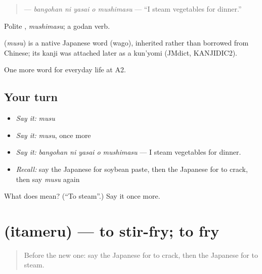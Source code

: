 \begin{quote}
\textbf{  } — \emph{bangohan ni yasai o mushimasu} — \textquotedblleft{}I steam vegetables for dinner.\textquotedblright{}
\end{quote}

Polite \textbf{}, \emph{mushimasu}; a godan verb.

\begin{cousinweb}
\textbf{} (\emph{musu}) is a native Japanese word (wago), inherited rather than borrowed from Chinese; its kanji was attached later as a kun'yomi (JMdict, KANJIDIC2).
\end{cousinweb}

\begin{grammarlens}[title={What you've built}]
One more word for everyday life at A2.
\end{grammarlens}

\subsection*{Your turn}
\begin{itemize}
\raggedright
  \item \emph{Say it:} \emph{musu}
  \item \emph{Say it:} \emph{musu}, once more
  \item \emph{Say it:} \emph{bangohan ni yasai o mushimasu} — I steam vegetables for dinner.
  \item \emph{Recall:} say the Japanese for soybean paste, then the Japanese for to crack, then say \emph{musu} again
\end{itemize}

\begin{tcolorbox}[breakable,colback=teal!4,colframe=teal!35!black,title={Before you move on}]
What does  mean? (\textquotedblleft{}To steam\textquotedblright{}.) Say it once more.
\end{tcolorbox}
\section[\texorpdfstring{\ja{いためる} (itameru)}{いためる (itameru)}]{ (itameru) — to stir-fry; to fry}

\label{lesson:JA-C176-itameru}



\begin{quote}
Before the new one: say the Japanese for to crack, then the Japanese for to steam.
\end{quote}

